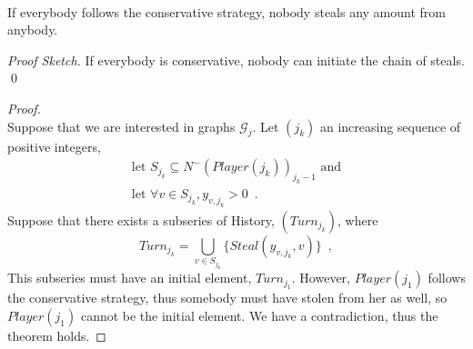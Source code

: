 \documentclass[11pt]{llncs}
\theoremstyle{definition}
\newenvironment{proofsketch}{\textit{Proof Sketch.}}{\qed \bigskip \ \\}
\begin{document}
    \begin{theorem} \ \\
       \label{conservativeworld}
       If everybody follows the conservative strategy, nobody steals any amount from anybody.
    \end{theorem}
    \begin{proofsketch}
       If everybody is conservative, nobody can initiate the chain of steals.
    \end{proofsketch}
    \begin{proof} \ \\
       Suppose that we are interested in graphs $\mathcal{G}_j$. Let $(j_k)$ an increasing sequence of positive integers,
       \begin{equation}
       \begin{gathered}
          \mbox{let } S_{j_k} \subseteq N^{-}\left(Player\left(j_k\right)\right)_{j_k-1} \mbox{ and} \\
          \mbox{let } \forall v \in S_{j_k}, y_{v, j_k} > 0\enspace.
       \end{gathered}
       \end{equation}
       Suppose that there exists a subseries of History, $(Turn_{j_k})$, where
       \begin{equation}
          Turn_{j_k} = \bigcup\limits_{v \in S_{j_k}}\{Steal(y_{v, j_k},v)\} \enspace,
       \end{equation}
       This subseries must have an initial element, $Turn_{j_1}$. However, $Player(j_1)$ follows the conservative strategy,
       thus somebody must have stolen from her as well, so $Player(j_1)$ cannot be the initial element. We have a
       contradiction, thus the theorem holds.
    \end{proof}
\end{document}
